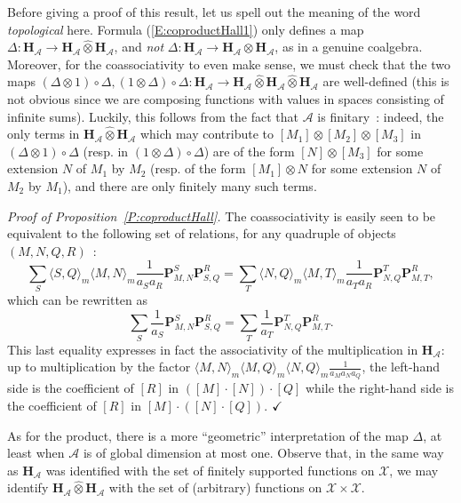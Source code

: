 \documentclass[a4paper,10pt]{amsart}
\def\H{\mathbf{H}}
\def\qed{$\hfill \checkmark$}
\def\A{\mathcal{A}}
\numberwithin{equation}{section}
\begin{document}
Before giving a proof of this result, let us spell out the meaning of the word \textit{topological} here. Formula (\ref{E:coproductHall1}) only defines a map $\Delta: \H_{\A} \to \H_{\A} \widehat{\otimes} \H_{\A}$, and \textit{not} $\Delta: \H_{\A} \to \H_{\A} {\otimes} \H_{\A}$, as in a genuine coalgebra. Moreover, for the coassociativity to even make sense, we must check that the two maps $(\Delta \otimes 1) \circ \Delta,
(1 \otimes \Delta) \circ \Delta : \H_{\A} \to \H_{\A} \widehat{\otimes} \H_{\A} \widehat{\otimes} \H_{\A}$ are well-defined (this is not obvious since we are composing functions with values in spaces consisting of infinite sums). Luckily, this follows from the fact that $\A$ is finitary~: indeed, the only terms in $\H_\A \widehat{\otimes} \H_{\A}$ which may contribute to $[M_1] \otimes [M_2] \otimes [M_3]$ in $(\Delta \otimes 1)\circ \Delta$ (resp. in $(1 \otimes \Delta) \circ \Delta$) are of the form $[N] \otimes [M_3]$ for some extension $N$ of $M_1$ by $M_2$ (resp. of the form $[M_1] \otimes N$ for some extension $N$ of $M_2$ by $M_1$), and there are only finitely many such terms.

\vspace{.1in}

\noindent
\textit{Proof of Proposition~\ref{P:coproductHall}.} The coassociativity is easily seen to be equivalent to the following set of relations, for any quadruple of objects $(M, N, Q, R)$~:
$$\sum_S \langle S,Q \rangle_m \langle M,N\rangle_m \frac{1}{a_Sa_R} \mathbf{P}^S_{M,N} \mathbf{P}^R_{S,Q}=\sum_T \langle N,Q \rangle_m \langle M,T\rangle_m \frac{1}{a_Ta_R} \mathbf{P}^T_{N,Q} \mathbf{P}^R_{M,T},$$
which can be rewritten as
$$\sum_S  \frac{1}{a_S} \mathbf{P}^S_{M,N} \mathbf{P}^R_{S,Q}=\sum_T  \frac{1}{a_T} \mathbf{P}^T_{N,Q} \mathbf{P}^R_{M,T}.$$
This last equality expresses in fact the associativity of the multiplication in $\H_{\A}$: up to multiplication by the factor $\langle M,N \rangle_m \langle M, Q \rangle_m \langle N, Q \rangle_m \frac{1}{a_Ma_Na_Q}$, the left-hand side is the coefficient of $[R]$ in $([M] \cdot [N]) \cdot [Q]$ while the
right-hand side is the coefficient of $[R]$ in $[M] \cdot ([N] \cdot [Q])$. \qed

\vspace{.2in}

As for the product, there is a more ``geometric'' interpretation of the map $\Delta$, at least when $\A$ is of global dimension at most one. Observe that, in the same way as $\H_{\A}$ was identified with the set of finitely supported functions on $\mathcal{X}$, we may identify $\H_{\A} \widehat{\otimes} \H_{\A}$ with the set of (arbitrary) functions on $\mathcal{X} \times \mathcal{X}$.
\end{document}
